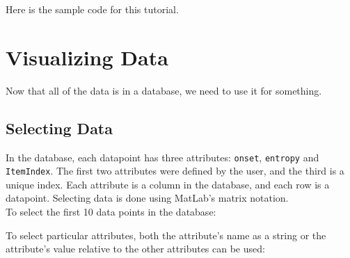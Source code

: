 \documentclass{article}
\begin{document}
Here is the sample code for this tutorial.



\section{Visualizing Data}

Now that all of the data is in a database, we need to use it for something.

\subsection{Selecting Data}

In the database, each datapoint has three attributes: \texttt{onset}, \texttt{entropy} and \texttt{ItemIndex}. The first two attributes were defined by the user, and the third is a unique index. Each attribute is a column in the database, and each row is a datapoint. Selecting data is done using MatLab's matrix notation.\\

To select the first 10 data points in the database:



To select particular attributes, both the attribute's name as a string or the attribute's value relative to the other attributes can be used:


\end{document}

